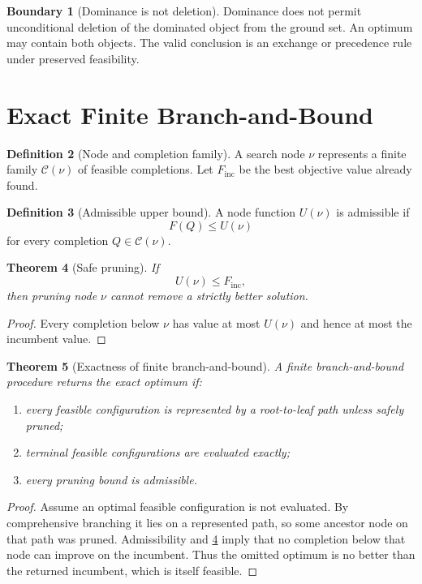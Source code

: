 \documentclass[11pt]{article}
\newtheorem{theorem}{Theorem}[section]
\theoremstyle{definition}
\newtheorem{definition}[theorem]{Definition}
\newtheorem{boundary}[theorem]{Boundary}
\theoremstyle{remark}
\begin{document}
\begin{boundary}[Dominance is not deletion]\label{bdry:not-deletion}
Dominance does not permit unconditional deletion of the dominated object from the ground set. An optimum may contain both objects. The valid conclusion is an exchange or precedence rule under preserved feasibility.
\end{boundary}

\section{Exact Finite Branch-and-Bound}

\begin{definition}[Node and completion family]\label{def:node}
A search node $\nu$ represents a finite family $\mathcal C(\nu)$ of feasible completions. Let $F_{\mathrm{inc}}$ be the best objective value already found.
\end{definition}

\begin{definition}[Admissible upper bound]\label{def:admissible}
A node function $U(\nu)$ is admissible if
\[
F(Q)\le U(\nu)
\]
for every completion $Q\in\mathcal C(\nu)$.
\end{definition}

\begin{theorem}[Safe pruning]\label{thm:safe-pruning}
If
\[
U(\nu)\le F_{\mathrm{inc}},
\]
then pruning node $\nu$ cannot remove a strictly better solution.
\end{theorem}

\begin{proof}
Every completion below $\nu$ has value at most $U(\nu)$ and hence at most the incumbent value.
\end{proof}

\begin{theorem}[Exactness of finite branch-and-bound]\label{thm:bnb-exact}
A finite branch-and-bound procedure returns the exact optimum if:
\begin{enumerate}[label=(\roman*)]
\item every feasible configuration is represented by a root-to-leaf path unless safely pruned;
\item terminal feasible configurations are evaluated exactly;
\item every pruning bound is admissible.
\end{enumerate}
\end{theorem}

\begin{proof}
Assume an optimal feasible configuration is not evaluated. By comprehensive branching it lies on a represented path, so some ancestor node on that path was pruned. Admissibility and \cref{thm:safe-pruning} imply that no completion below that node can improve on the incumbent. Thus the omitted optimum is no better than the returned incumbent, which is itself feasible.
\end{proof}
\end{document}
